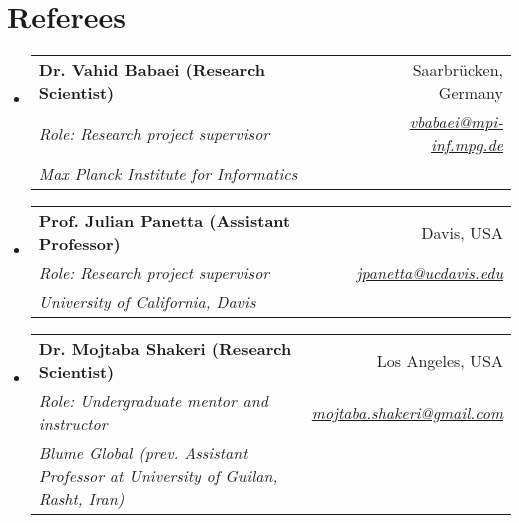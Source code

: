 \documentclass[letterpaper,11pt]{article}
\makeatletter
\newcommand{\resumeSubheading}[5]{
  \item
    \begin{tabular*}{0.97\textwidth}{l@{\extracolsep{\fill}}r}
      \textbf{#1} & #2 \\ 
      \textit{\small#3} & \textit{\small #4} \\
      \textit{#5} & 
    \end{tabular*}\vspace{-5pt}
}
\newcommand{\resumeSubHeadingListStart}{\begin{itemize}[leftmargin=*]}
\newcommand{\resumeSubHeadingListEnd}{\end{itemize}}
\makeatother
\begin{document}
\section{Referees}
  \resumeSubHeadingListStart
    \resumeSubheading
      {Dr. Vahid Babaei (Research Scientist)}{Saarbr{\"u}cken, Germany}
       {Role: Research project supervisor}
      {\href{mailto:vbabaei@mpi-inf.mpg.de}{vbabaei@mpi-inf.mpg.de}}{Max Planck Institute for Informatics}

    \resumeSubheading
      {Prof. Julian Panetta (Assistant Professor)}{Davis, USA}
       {Role: Research project supervisor}
      {\href{mailto:jpanetta@ucdavis.edu}{jpanetta@ucdavis.edu}}{University of California, Davis}
    
    \resumeSubheading
      {Dr. Mojtaba Shakeri (Research Scientist)}{Los Angeles, USA}
       {Role: Undergraduate mentor and instructor}
      {\href{mailto:mojtaba.shakeri@gmail.com}{mojtaba.shakeri@gmail.com}}{Blume Global (prev. Assistant Professor at University of Guilan, Rasht, Iran)}
  \resumeSubHeadingListEnd
\end{document}
